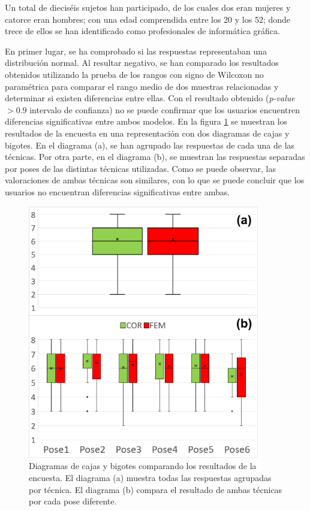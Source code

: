 Un total de dieciséis sujetos han participado, de los cuales dos eran mujeres y catorce eran hombres;
con una edad comprendida entre los 20 y los 52; donde trece de ellos se han identificado como profesionales de informática gráfica.


En primer lugar, se ha comprobado si las respuestas representaban una distribución normal. Al resultar negativo, se han comparado los resultados obtenidos utilizando la prueba de los rangos con signo de Wilcoxon no paramétrica para comparar el rango medio de dos muestras relacionadas y determinar si existen diferencias entre ellas. Con el resultado obtenido (\emph{p-value} $> 0.9$ intervalo de confianza) no se puede confirmar que los usuarios encuentren diferencias significativas entre ambos modelos. 
En la figura \ref{fig:stat} se muestran los resultados de la encuesta en una representación con dos diagramas de cajas y bigotes. En el diagrama (a), se han agrupado las respuestas de cada una de las técnicas. Por otra parte, en el diagrama (b), se muestran las respuestas separadas por poses de las distintas técnicas utilizadas. Como se puede observar, las valoraciones de ambas técnicas son similares, con lo que se puede concluir que los usuarios no encuentran diferencias significativas entre ambas.  
%

%

\begin{figure}[ht]%
   \centering
   \includegraphics[width=0.9\textwidth]{IMG/boxplot}
    \caption{Diagramas de cajas y bigotes comparando los resultados de la encuesta. El diagrama (a) muestra todas las respuestas agrupadas por técnica. El diagrama (b) compara el resultado de ambas técnicas por cada pose diferente.}
\label{fig:stat}
   \end{figure}

